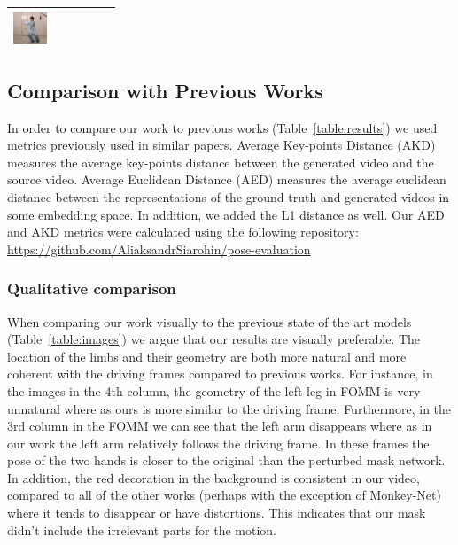 \documentclass{article}
\begin{document}
\begin{table}[t]
\begin{center}
\begin{small}
\begin{sc}
\begin{tabular}{m{1.0cm}m{1.0cm}m{1.0cm}m{1.0cm}m{1.0cm}m{1.0cm}}
\includegraphics[width=1cm, height=1cm]{images/5_Ours_5} \\
\bottomrule
\end{tabular}
\end{sc}
\end{small}
\end{center}
\vskip -0.1in
\end{table}


\subsection{Comparison with Previous Works}
In order to compare our work to previous works (Table~\ref{table:results})
we used metrics previously used in similar papers.
Average Key-points Distance \cite{cao2017realtime} (AKD)
measures the average key-points distance between the generated video and
the source video. Average Euclidean Distance \cite{zheng2019joint} (AED)
measures the average euclidean distance
 between the representations of the ground-truth and generated videos in
 some embedding space. In addition, we added the L1 distance as well.
 Our AED and AKD metrics were calculated using the following repository:
 \url{https://github.com/AliaksandrSiarohin/pose-evaluation}

\subsubsection{Qualitative comparison}
When comparing our work visually to the previous state of the art models
(Table~\ref{table:images}) we argue that our results are visually preferable.
The location of the limbs and their geometry are both more natural and more
coherent with the driving frames compared to previous works. For instance,
in the images in the 4th column, the geometry of the left leg in FOMM
is very unnatural where as ours is more similar to the driving frame.
Furthermore, in the 3rd column in the FOMM we can see that the left arm
disappears where as in our work the left arm relatively follows the driving
frame. In these frames the pose of the two hands is closer to the original
than the perturbed mask network.
In addition, the red decoration in the background is consistent in
our video, compared to all of the other works (perhaps with the exception
of Monkey-Net) where it tends to disappear
or have distortions. This indicates that our mask didn't include the
irrelevant parts for the motion.
\end{document}
